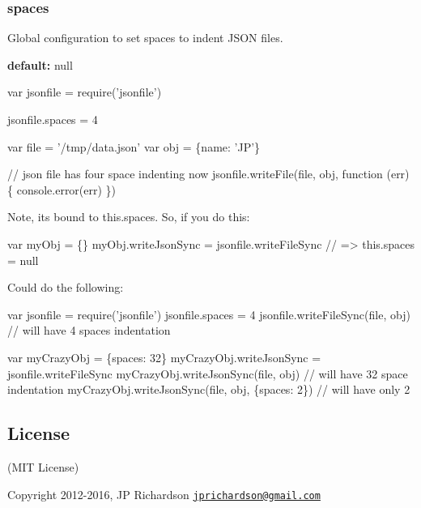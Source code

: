 \subsubsection*{spaces}

Global configuration to set spaces to indent J\+S\+ON files.

{\bfseries default\+:} {\ttfamily null}


\begin{DoxyCode}
var jsonfile = require('jsonfile')

jsonfile.spaces = 4

var file = '/tmp/data.json'
var obj = \{name: 'JP'\}

// json file has four space indenting now
jsonfile.writeFile(file, obj, function (err) \{
  console.error(err)
\})
\end{DoxyCode}


Note, it\textquotesingle{}s bound to {\ttfamily this.\+spaces}. So, if you do this\+:


\begin{DoxyCode}
var myObj = \{\}
myObj.writeJsonSync = jsonfile.writeFileSync
// => this.spaces = null
\end{DoxyCode}


Could do the following\+:


\begin{DoxyCode}
var jsonfile = require('jsonfile')
jsonfile.spaces = 4
jsonfile.writeFileSync(file, obj) // will have 4 spaces indentation

var myCrazyObj = \{spaces: 32\}
myCrazyObj.writeJsonSync = jsonfile.writeFileSync
myCrazyObj.writeJsonSync(file, obj) // will have 32 space indentation
myCrazyObj.writeJsonSync(file, obj, \{spaces: 2\}) // will have only 2
\end{DoxyCode}


\subsection*{License }

(M\+IT License)

Copyright 2012-\/2016, JP Richardson \href{mailto:jprichardson@gmail.com}{\tt jprichardson@gmail.\+com} 